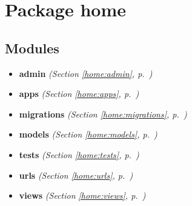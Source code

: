 %
%
%


\section{Package home}

    \label{home}


\subsection{Modules}

\begin{itemize}
\setlength{\parskip}{0ex}
\item \textbf{admin}
  \textit{(Section \ref{home:admin}, p.~\pageref{home:admin})}

\item \textbf{apps}
  \textit{(Section \ref{home:apps}, p.~\pageref{home:apps})}

\item \textbf{migrations}
  \textit{(Section \ref{home:migrations}, p.~\pageref{home:migrations})}

\item \textbf{models}
  \textit{(Section \ref{home:models}, p.~\pageref{home:models})}

\item \textbf{tests}
  \textit{(Section \ref{home:tests}, p.~\pageref{home:tests})}

\item \textbf{urls}
  \textit{(Section \ref{home:urls}, p.~\pageref{home:urls})}

\item \textbf{views}
  \textit{(Section \ref{home:views}, p.~\pageref{home:views})}

\end{itemize}



